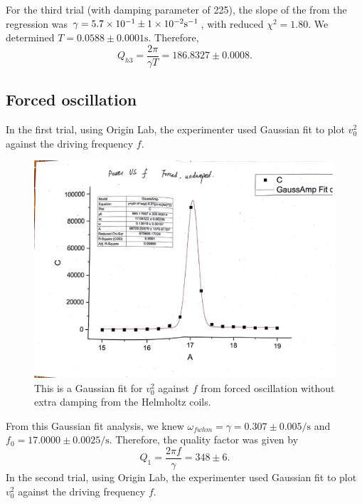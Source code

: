 \documentclass[a4paper,12pt]{article}
\begin{document}
For the third trial (with damping parameter of 225), the slope of the from the regression was \( \gamma = \num{5.7d-1} \pm \num{1d-2} \unit{\per\second} \), with reduced \( \chi^2 = 1.80 \). We determined \( T = 0.0588 \pm 0.0001 \unit{\second} \). Therefore,
\begin{equation}
	Q_{h3} = \frac{2\pi}{\gamma T} = 186.8327 \pm 0.0008.
\end{equation} 
\subsection{Forced oscillation}
In the first trial, using Origin Lab, the experimenter used Gaussian fit to plot \( v_0^2 \) against the driving frequency \( f \). 
\begin{figure}[h]
	\centering
	\includegraphics[scale=0.4]{images/undamped.pdf}
	\caption{This is a Gaussian fit for \(v_0^2 \) against \( f \) from forced oscillation without extra damping from the Helmholtz coils.}
\end{figure}
From this Gaussian fit analysis, we knew \(\omega_{fwhm} = \gamma = 0.307 \pm 0.005 \unit{\per \second} \) and \( f_0 = 17.0000 \pm 0.0025 \unit{\per\second} \). Therefore, the quality factor was given by
\begin{equation}
	Q_1 = \frac{2\pi f}{\gamma} = 348 \pm 6.
\end{equation}
In the second trial, using Origin Lab, the experimenter used Gaussian fit to plot \( v_0^2 \) against the driving frequency \( f \). 
\end{document}
